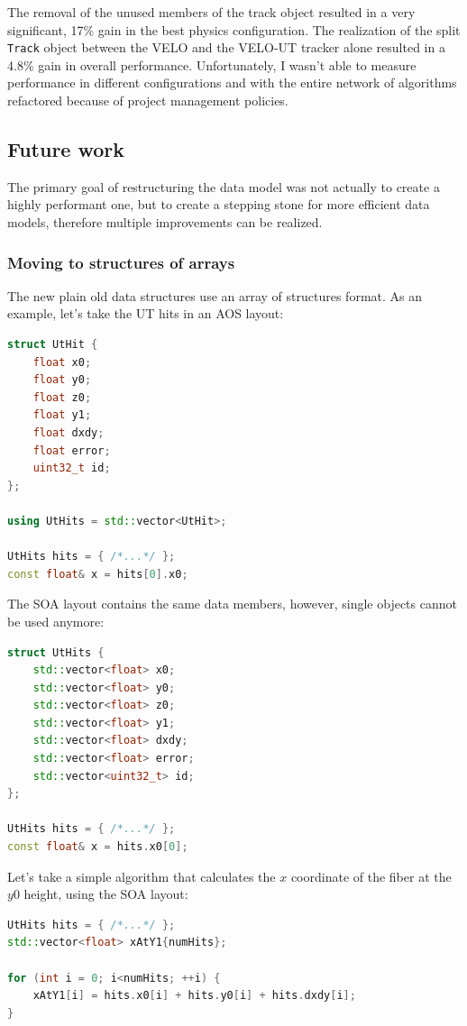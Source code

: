 \documentclass[12pt]{article}
\newcommand{\code}[1]{\texttt{#1}}
\begin{document}
The removal of the unused members of the track object resulted in a very significant, 17\% gain in the best physics configuration. The realization of the split \code{Track} object between the VELO and the VELO-UT tracker alone resulted in a 4.8\% gain in overall performance. Unfortunately, I wasn't able to measure performance in different configurations and with the entire network of algorithms refactored because of project management policies.


\subsection{Future work}

The primary goal of restructuring the data model was not actually to create a highly performant one, but to create a stepping stone for more efficient data models, therefore multiple improvements can be realized.

\subsubsection{Moving to structures of arrays}

The new plain old data structures use an array of structures format. As an example, let's take the UT hits in an AOS layout:

\begin{lstlisting}[language=C++]
struct UtHit {
	float x0;
	float y0;
	float z0;
	float y1;
	float dxdy;
	float error;
	uint32_t id;
};

using UtHits = std::vector<UtHit>;

UtHits hits = { /*...*/ };
const float& x = hits[0].x0;
\end{lstlisting}

The SOA layout contains the same data members, however, single objects cannot be used anymore:

\begin{lstlisting}[language=C++]
struct UtHits {
	std::vector<float> x0;
	std::vector<float> y0;
	std::vector<float> z0;
	std::vector<float> y1;
	std::vector<float> dxdy;
	std::vector<float> error;
	std::vector<uint32_t> id;
};

UtHits hits = { /*...*/ };
const float& x = hits.x0[0];
\end{lstlisting}

Let's take a simple algorithm that calculates the $x$ coordinate of the fiber at the $y0$ height, using the SOA layout:

\begin{lstlisting}[language=C++]
UtHits hits = { /*...*/ };
std::vector<float> xAtY1{numHits};

for (int i = 0; i<numHits; ++i) {
	xAtY1[i] = hits.x0[i] + hits.y0[i] + hits.dxdy[i];
}
\end{lstlisting}
\end{document}
